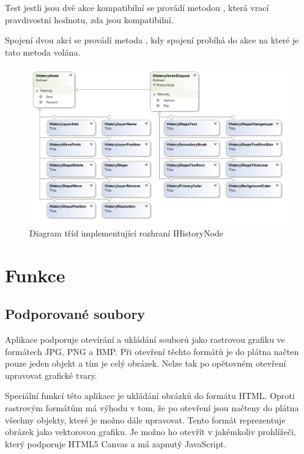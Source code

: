 \documentclass[
  field=inf,
  biblatex,
  glossaries,
  index
]{kidiplom}
\begin{document}
Test jestli jsou dvě akce  kompatibilní se provádí metodou , která vrací pravdivostní hodnotu, zda jsou kompatibilní.

Spojení dvou akcí se provádí metoda , kdy spojení probíhá do akce na které je tato metoda volána.


\begin{figure}
\includegraphics[width=15cm]{img/history_diag}
\caption{Diagram tříd implementující rozhraní IHistoryNode}
\end{figure}  

\section{Funkce}

\subsection{Podporované soubory}

Aplikace podporuje otevírání a ukládání souborů jako rastrovou grafiku ve formátech JPG, PNG a BMP. Při otevření těchto formátů je do plátna načten pouze jeden objekt a tím je celý obrázek. Nelze tak po opětovném otevření upravovat grafické tvary. 

Speciální funkcí této aplikace je ukládání obrázků do formátu HTML. Oproti rastrovým formátům má výhodu v tom, že po otevření jsou načteny do plátna všechny objekty, které je možno dále upravovat. Tento formát reprezentuje obrázek jako vektorovou grafiku. Je možno ho otevřít v jakémkoliv prohlížeči, který podporuje HTML5 Canvas a má zapnutý JavaScript.
\end{document}
